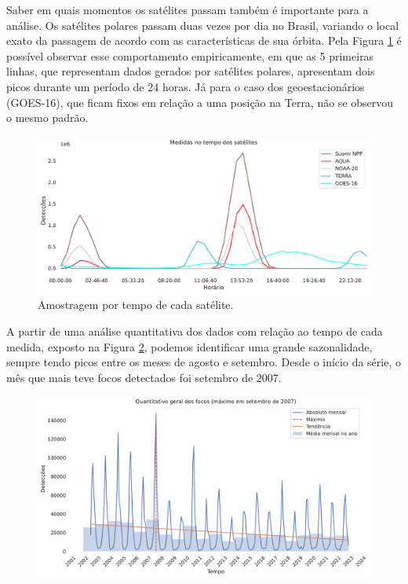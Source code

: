\documentclass[cic,tc]{iiufrgs}
\begin{document}
Saber em quais momentos os satélites passam também é importante para a análise. Os satélites polares passam duas vezes por dia no Brasil, variando o local exato da passagem de acordo com as características de sua órbita. Pela Figura \ref{fig:tempo_medidas_satelites} é possível observar esse comportamento empiricamente, em que as 5 primeiras linhas, que representam dados gerados por satélites polares, apresentam dois picos durante um período de 24 horas. Já para o  caso dos geoestacionários (GOES-16), que ficam fixos em relação a uma posição na Terra, não se observou o mesmo padrão. \par

\begin{figure}[H]
    \caption{Amostragem por tempo de cada satélite.}
    \begin{center}
        \includegraphics[width=35em]{tempo_medidas_satelites}
    \end{center}
    \label{fig:tempo_medidas_satelites}
\end{figure}

A partir de uma análise quantitativa dos dados com relação ao tempo de cada medida, exposto na Figura \ref{fig:quantitativo_geral}, podemos identificar uma grande sazonalidade, sempre tendo picos entre os meses de agosto e setembro. Desde o início da série, o mês que mais teve focos detectados foi setembro de 2007. 

\begin{figure}[H]
    \caption{}
    \begin{center}
        \includegraphics[width=35em]{quantitativo_geral}
    \end{center}
    \label{fig:quantitativo_geral}
\end{figure}
\end{document}
